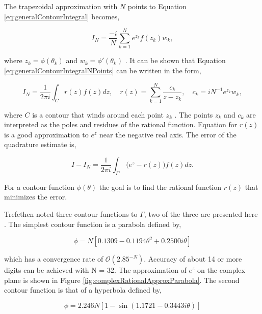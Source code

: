 \noindent The trapezoidal approximation with $N$ points to Equation \ref{eq:generalContourIntegral} becomes,

\begin{equation}
    I_{N} = \frac{-i}{N}\sum_{k=1}^{N}e^{z_{k}}f(z_{k})w_{k},
    \label{eq:generalContourIntegralNPoints}
\end{equation}

\noindent where $z_{k} = \phi(\theta_{k})$ and  $w_{k} = \phi'(\theta_{k})$ \cite{Trefethen2006}. It can be shown that Equation \ref{eq:generalContourIntegralNPoints} can be written in the form,

\begin{equation}
    I_{N} = \frac{1}{2\pi i}\int_{C}r(z)f(z)dz, \quad r(z) = \sum_{k=1}^{N}\frac{c_{k}}{z-z_{k}}, \quad c_{k} = iN^{-1}e^{z_{k}}w_{k},
\end{equation}

\noindent where $C$ is a contour that winds around each point $z_{k}$ \cite{Trefethen2006}. The points $z_{k}$ and $c_{k}$ are interpreted as the poles and residues of the rational function. Equation for $r(z)$ is a good approximation to $e^{z}$ near the negative real axis. The error of the quadrature estimate is,

\begin{equation}
    I - I_{N} = \frac{1}{2\pi i}\int_{\Gamma'} \big(e^{z} - r(z)\big)f(z)dz.
\end{equation}{}

\noindent For a contour function $\phi(\theta)$ the goal is to find the rational function $r(z)$ that minimizes the error. 

Trefethen noted three contour functions to $\Gamma$, two of the three are presented here \cite{Trefethen2006}. The simplest contour function is a parabola defined by, 

\begin{equation}
    \phi = N[0.1309 - 0.1194\theta^{2} + 0.2500i\theta]
    \label{eq:parabolicContour}
\end{equation}

\noindent which has a convergence rate of $\mathcal{O}(2.85^{-N} )$. Accuracy of about 14 or more digits can be achieved with N = 32. The approximation of $e^{z}$ on the complex plane is shown in Figure \ref{fig:complexRationalApproxParabola}. The second contour function is that of a hyperbola defined by, 

\begin{equation}
    \phi = 2.246N[1 - \sin(1.1721 - 0.3443i\theta)]
    \label{eq:hyperbolicContour}
\end{equation}

